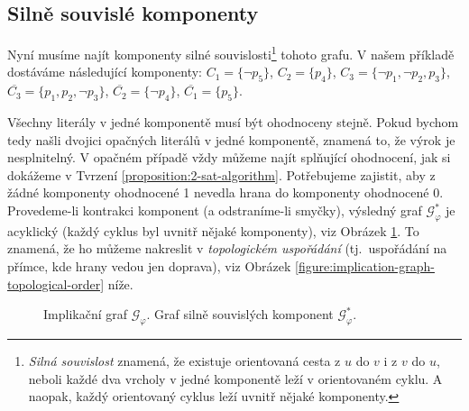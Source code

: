 \subsection{Silně souvislé komponenty}

Nyní musíme najít komponenty silné souvislosti\footnote{\emph{Silná souvislost} znamená, že existuje orientovaná cesta z $u$ do $v$ i z $v$ do $u$, neboli každé dva vrcholy v jedné komponentě leží v orientovaném cyklu. A naopak, každý orientovaný cyklus leží uvnitř nějaké komponenty.} tohoto grafu. V našem příkladě dostáváme následující komponenty: $C_1=\{\neg p_5\}$, $C_2=\{p_4\}$, $C_3=\{\neg p_1,\neg p_2,p_3\}$, $\overline{C_3}=\{p_1,p_2,\neg p_3\}$, $\overline{C_2}=\{\neg p_4\}$, $\overline{C_1}=\{p_5\}$.

Všechny literály v jedné komponentě musí být ohodnoceny stejně. Pokud bychom tedy našli dvojici opačných literálů v jedné komponentě, znamená to, že výrok je nesplnitelný. V opačném případě vždy můžeme najít splňující ohodnocení, jak si dokážeme v Tvrzení \ref{proposition:2-sat-algorithm}. Potřebujeme zajistit, aby z žádné komponenty ohodnocené 1 nevedla hrana do komponenty ohodnocené 0. Provedeme-li kontrakci komponent (a odstraníme-li smyčky), výsledný graf $\mathcal G_\varphi^\ast$ je acyklický (každý cyklus byl uvnitř nějaké komponenty), viz Obrázek \ref{figure:implication-graph-components}. To znamená, že ho můžeme nakreslit v \emph{topologickém uspořádání} (tj.\ uspořádání na přímce, kde hrany vedou jen doprava), viz Obrázek \ref{figure:implication-graph-topological-order} níže. 

\begin{figure} 
    \small   
    \centering
        \caption{Implikační graf $\mathcal G_\varphi$. Graf silně souvislých komponent $\mathcal G_\varphi^\ast$.}\label{figure:implication-graph-components}
\end{figure}

